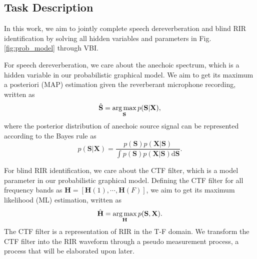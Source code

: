 \subsection{Task Description}

In this work, we aim to jointly complete speech dereverberation and blind RIR identification by solving all hidden variables and parameters in Fig. \ref{fig:prob_model} through VBI.

For speech dereverberation, we care about the anechoic spectrum, which is a hidden variable in our probabilistic graphical model.
We aim to get its maximum a posteriori (MAP) estimation given the reverberant microphone recording, written as
\begin{equation}
    \hat{\mathbf{S}}=\operatorname*{arg\,max}\limits_{\mathbf{S}}p(\mathbf{S}|\mathbf{X}),
\end{equation}
where the posterior distribution of anechoic source signal can be represented according to the Bayes rule as 
\begin{equation}
    \label{eq:posterior}
    p(\mathbf{S}|\mathbf{X})=\frac{p(\mathbf{S})p(\mathbf{X}|\mathbf{S})}{\int p(\mathbf{S})p(\mathbf{X}|\mathbf{S}) \mathrm{d}\mathbf{S}}.
\end{equation}

For blind RIR identification, we care about the CTF filter, which is a model parameter in our probabilistic graphical model.
Defining the CTF filter for all frequency bands as $\mathbf{H}=\left[\mathbf{H}(1),\cdots,\mathbf{H}(F)\right]$, we aim to get its maximum likelihood (ML) estimation, written as
\begin{equation}
    \hat{\mathbf{H}}=\operatorname*{arg\,max}\limits_{\mathbf{H}}p(\mathbf{S},\mathbf{X}).
\end{equation}
The CTF filter is a representation of RIR in the T-F domain.
We transform the CTF filter into the RIR waveform through a pseudo measurement process, a process that will be elaborated upon later.



